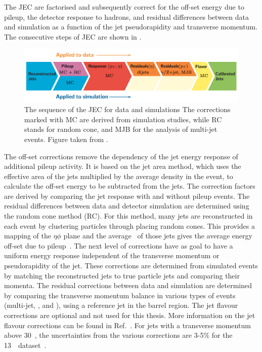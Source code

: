 The JEC are factorised and subsequently correct for the off-set energy due to pileup, the detector response to hadrons, and residual differences between data and simulation as a function of the jet pseudorapidity and transverse momentum.  The consecutive steps of JEC are shown in . 
\begin{figure}[htbp]
	\centering
	\includegraphics[width=1.\linewidth]{4_EventRecoSelect/Figures/JES}
	\caption{The sequence of the JEC for data and simulations The corrections marked with MC are derived from simulation studies, while RC stands for random cone, and MJB for the analysis of multi-jet events. Figure taken from \cite{1748-0221-12-02-P02014}.}
	\label{fig:jes}
\end{figure}
The off-set corrections remove the dependency of the jet energy response of additional pileup activity. It is based on the jet area method, which uses the effective area of the jets multiplied by the average density in the event, to calculate the off-set energy to be subtracted from the jets.  The correction factors are derived by comparing the jet response with and without pileup events. The residual differences between data and detector simulation are determined using the random cone method (RC). For this method, many jets are reconstructed in each event by clustering particles through placing  random cones. This provides a mapping of the $\eta\phi$ plane and the average \pt\ of those jets gives the average energy off-set due to pileup~\cite{1748-0221-12-02-P02014}. 
The next level of corrections have as goal to have a uniform energy response independent of the transverse momentum or pseudorapidity of the jet.  These corrections are determined from simulated events by matching the reconstructed jets to true particle jets and comparing their momenta. 
The residual corrections between data and simulation are determined by comparing the transverse momentum balance in various types of events (multi-jet, \Zjets, and \pjets), using a reference jet in the barrel region.  
The jet flavour corrections are optional and not used for this thesis. More information on the jet flavour corrections can be found in Ref.~\cite{1748-0221-12-02-P02014}. For jets with a transverse momentum above 30~\GeV, the uncertainties from the various corrections are 3-5\% for the 13~\TeV\ dataset~\cite{CMS-DP-2016-020}.


